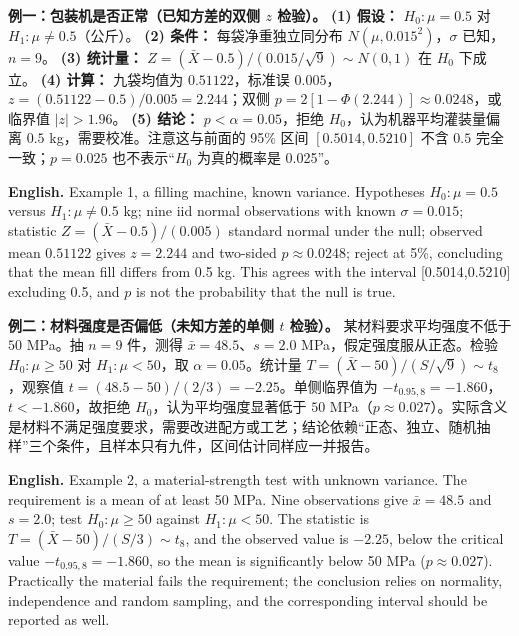 \documentclass[UTF8,11pt,a4paper]{ctexart}
\newcommand{\EN}[1]{\par\noindent\textbf{English.} #1\par}
\begin{document}
\noindent\textbf{例一：包装机是否正常（已知方差的双侧 $z$ 检验）。}
\textbf{(1) 假设：} $H_0:\mu=0.5$ 对 $H_1:\mu\ne0.5$（公斤）。
\textbf{(2) 条件：} 每袋净重独立同分布 $N(\mu,0.015^2)$，$\sigma$ 已知，$n=9$。
\textbf{(3) 统计量：} $Z=(\bar X-0.5)/(0.015/\sqrt9)\sim N(0,1)$ 在 $H_0$ 下成立。
\textbf{(4) 计算：} 九袋均值为 $0.51122$，标准误 $0.005$，$z=(0.51122-0.5)/0.005=2.244$；双侧 $p=2[1-\Phi(2.244)]\approx0.0248$，或临界值 $|z|>1.96$。
\textbf{(5) 结论：} $p<\alpha=0.05$，拒绝 $H_0$，认为机器平均灌装量偏离 $0.5$ kg，需要校准。注意这与前面的 95\% 区间 $[0.5014,0.5210]$ 不含 $0.5$ 完全一致；$p=0.025$ 也不表示“$H_0$ 为真的概率是 0.025”。
\EN{Example 1, a filling machine, known variance. Hypotheses $H_0:\mu=0.5$ versus $H_1:\mu\ne0.5$ kg; nine iid normal observations with known $\sigma=0.015$; statistic $Z=(\bar X-0.5)/(0.005)$ standard normal under the null; observed mean $0.51122$ gives $z=2.244$ and two-sided $p\approx0.0248$; reject at 5\%, concluding that the mean fill differs from 0.5 kg. This agrees with the interval [0.5014,0.5210] excluding 0.5, and $p$ is not the probability that the null is true.}

\noindent\textbf{例二：材料强度是否偏低（未知方差的单侧 $t$ 检验）。}
某材料要求平均强度不低于 $50$ MPa。抽 $n=9$ 件，测得 $\bar x=48.5$、$s=2.0$ MPa，假定强度服从正态。检验 $H_0:\mu\ge50$ 对 $H_1:\mu<50$，取 $\alpha=0.05$。统计量 $T=(\bar X-50)/(S/\sqrt9)\sim t_8$，观察值 $t=(48.5-50)/(2/3)=-2.25$。单侧临界值为 $-t_{0.95,8}=-1.860$，$t<-1.860$，故拒绝 $H_0$，认为平均强度显著低于 $50$ MPa（$p\approx0.027$）。实际含义是材料不满足强度要求，需要改进配方或工艺；结论依赖“正态、独立、随机抽样”三个条件，且样本只有九件，区间估计同样应一并报告。
\EN{Example 2, a material-strength test with unknown variance. The requirement is a mean of at least 50 MPa. Nine observations give $\bar x=48.5$ and $s=2.0$; test $H_0:\mu\ge50$ against $H_1:\mu<50$. The statistic is $T=(\bar X-50)/(S/3)\sim t_8$, and the observed value is $-2.25$, below the critical value $-t_{0.95,8}=-1.860$, so the mean is significantly below 50 MPa ($p\approx0.027$). Practically the material fails the requirement; the conclusion relies on normality, independence and random sampling, and the corresponding interval should be reported as well.}
\end{document}
